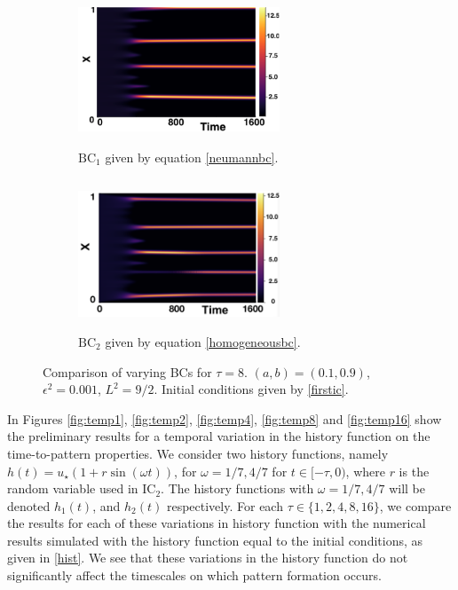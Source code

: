 \begin{figure}[H]
    \centering
    \begin{subfigure}[t]{0.45\textwidth}
        \centering
        \includegraphics[width=6cm,height=4.5cm]{ic28.png}
        \caption{$\text{BC}_1$ given by equation \eqref{neumannbc}.}
        \label{}
    \end{subfigure}
    \hfill
    \begin{subfigure}[t]{0.45\textwidth}
        \centering
        \includegraphics[width=6cm,height=4.5cm]{bc8.png}
        \caption{$\text{BC}_2$ given by equation \eqref{homogeneousbc}.}
        \label{}
    \end{subfigure}
    \caption{Comparison of varying BCs for $\tau=8$. $(a,b)=(0.1,0.9)$, $\epsilon^2=0.001$, $L^2=9/2$. Initial conditions given by \eqref{firstic}.}
    \label{fig:Bbc8}
\end{figure}

In Figures \ref{fig:temp1}, \ref{fig:temp2}, \ref{fig:temp4}, \ref{fig:temp8} and \ref{fig:temp16} show the preliminary results for a temporal variation in the history function on the time-to-pattern properties. We consider two history functions, namely $h(t)=u_\star(1+r\sin(\omega t))$, for $\omega=1/7,4/7$ for $t\in[-\tau,0)$, where $r$ is the random variable used in $\text{IC}_2$. The history functions with $\omega=1/7,4/7$ will be denoted $h_1(t)$, and $h_2(t)$ respectively. For each $\tau\in\{1,2,4,8,16\}$, we compare the results for each of these variations in history function with the numerical results simulated with the history function equal to the initial conditions, as given in \eqref{hist}. We see that these variations in the history function do not significantly affect the timescales on which pattern formation occurs.

